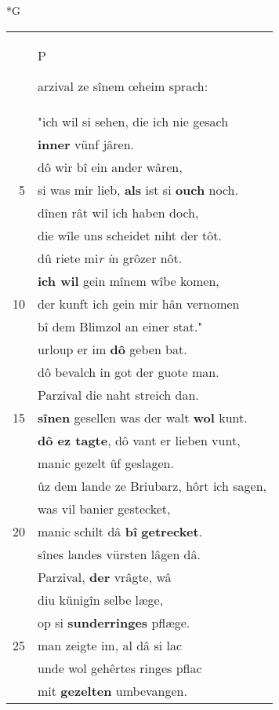 \documentclass[8pt,a4paper,notitlepage]{article}
\begin{document}
\begin{table}[ht]
\begin{minipage}[t]{0.5\linewidth}
\small
\begin{center}*G
\end{center}
\begin{tabular}{rl}
 & \begin{large}P\end{large}arzival ze sînem œheim sprach:\\ 
 & "ich wil si sehen, die ich nie gesach\\ 
 & \textbf{inner} vünf jâren.\\ 
 & dô wir bî ein ander wâren,\\ 
5 & si was mir lieb, \textbf{als} ist si \textbf{ouch} noch.\\ 
 & dînen rât wil ich haben doch,\\ 
 & die wîle uns scheidet niht der tôt.\\ 
 & dû riete mi\textit{r} \textit{i}n grôzer nôt.\\ 
 & \textbf{ich wil} gein mînem wîbe komen,\\ 
10 & der kunft ich gein mir hân vernomen\\ 
 & bî dem Blimzol an einer stat."\\ 
 & urloup er im \textbf{dô} geben bat.\\ 
 & dô bevalch in got der guote man.\\ 
 & Parzival die naht streich dan.\\ 
15 & \textbf{sînen} gesellen was der walt \textbf{wol} kunt.\\ 
 & \textbf{dô ez tagte}, dô vant er lieben vunt,\\ 
 & manic gezelt ûf geslagen.\\ 
 & ûz dem lande ze Briubarz, hôrt ich sagen,\\ 
 & was vil banier gestecket,\\ 
20 & manic schilt dâ \textbf{bî} \textbf{getrecket}.\\ 
 & sînes landes vürsten lâgen dâ.\\ 
 & Parzival, \textbf{der} vrâgte, wâ\\ 
 & diu künigîn selbe læge,\\ 
 & op si \textbf{sunderringes} pflæge.\\ 
25 & man zeigte im, al dâ si lac\\ 
 & unde wol gehêrtes ringes pflac\\ 
 & mit \textbf{gezelten} umbevangen.\\ 

\end{tabular}
\end{minipage}
\end{table}
\end{document}
